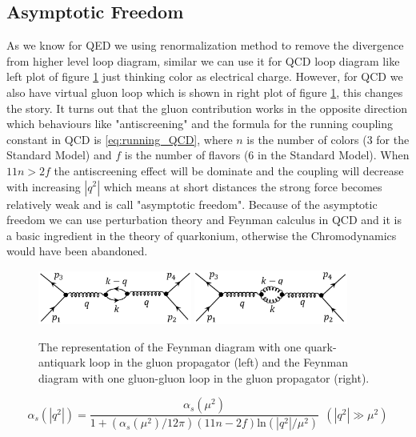 \subsection{Asymptotic Freedom}\label{subsec:asymptotic_freedom}
As we know for QED we using renormalization method to remove the divergence from higher level loop diagram, similar we can use it for QCD loop diagram like left plot of figure \ref{fig:QCD_loop} just thinking color as electrical charge. However, for QCD we also have virtual gluon loop which is shown in right plot of figure \ref{fig:QCD_loop}, this changes the story. It turns out that the gluon contribution works in the opposite direction which behaviours like "antiscreening" and the formula for the running coupling constant in QCD is \ref{eq:running_QCD}, where $n$ is the number of colors (3 for the Standard Model) and $f$ is the number of flavors (6 in the Standard Model). When $11n>2f$ the antiscreening effect will be dominate and the coupling will decrease with increasing $|q^{2}|$ which means at short distances the strong force becomes relatively weak and is call "asymptotic freedom". Because of the asymptotic freedom we can use perturbation theory and Feynman calculus in QCD and it is a basic ingredient in the theory of quarkonium, otherwise the Chromodynamics would have been abandoned.

\begin{figure}[h!]
 \begin{center}
\includegraphics[width=0.45\textwidth]{figures/theory/QCD_quark_loop.png}
\includegraphics[width=0.45\textwidth]{figures/theory/QCD_gluon_loop.png}
\caption{The representation of the Feynman diagram with one quark-antiquark loop in the gluon propagator (left) and the Feynman diagram with one gluon-gluon loop in the gluon propagator (right).}
  \label{fig:QCD_loop}
 \end{center}
\end{figure}

\begin{equation}
\alpha_{s}(|q^{2}|)=\frac{\alpha_{s}(\mu^{2})}{1+(\alpha_{s}(\mu^{2})/12\pi)(11n-2f)\mathrm{ln}(|q^{2}|/\mu^{2})}~~(|q^{2}|\gg\mu^{2})
\label{eq:running_QCD}
\end{equation}


